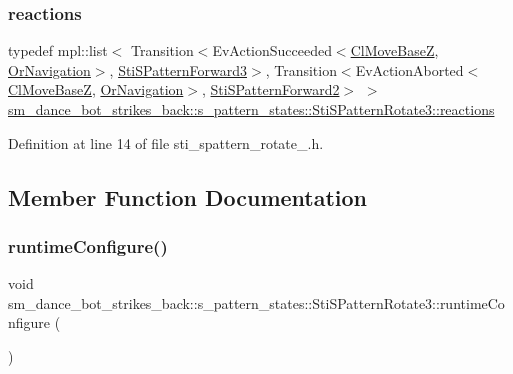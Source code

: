 \subsubsection{\texorpdfstring{reactions}{reactions}}
{\footnotesize\ttfamily typedef mpl\+::list$<$ Transition$<$Ev\+Action\+Succeeded$<$\hyperlink{classmove__base__z__client_1_1ClMoveBaseZ}{Cl\+Move\+BaseZ}, \hyperlink{classsm__dance__bot__strikes__back_1_1OrNavigation}{Or\+Navigation}$>$, \hyperlink{structsm__dance__bot__strikes__back_1_1s__pattern__states_1_1StiSPatternForward3}{Sti\+S\+Pattern\+Forward3}$>$, Transition$<$Ev\+Action\+Aborted$<$\hyperlink{classmove__base__z__client_1_1ClMoveBaseZ}{Cl\+Move\+BaseZ}, \hyperlink{classsm__dance__bot__strikes__back_1_1OrNavigation}{Or\+Navigation}$>$, \hyperlink{structsm__dance__bot__strikes__back_1_1s__pattern__states_1_1StiSPatternForward2}{Sti\+S\+Pattern\+Forward2}$>$ $>$ \hyperlink{structsm__dance__bot__strikes__back_1_1s__pattern__states_1_1StiSPatternRotate3_a01494011589ff9f082011cd9a33574e6}{sm\+\_\+dance\+\_\+bot\+\_\+strikes\+\_\+back\+::s\+\_\+pattern\+\_\+states\+::\+Sti\+S\+Pattern\+Rotate3\+::reactions}}



Definition at line 14 of file sti\+\_\+spattern\+\_\+rotate\+\_.\+h.



\subsection{Member Function Documentation}
\mbox{\label{structsm__dance__bot__strikes__back_1_1s__pattern__states_1_1StiSPatternRotate3_a208b42799fa33979d9151fcf2fa7b80c}} 
\subsubsection{\texorpdfstring{runtime\+Configure()}{runtimeConfigure()}}
{\footnotesize\ttfamily void sm\+\_\+dance\+\_\+bot\+\_\+strikes\+\_\+back\+::s\+\_\+pattern\+\_\+states\+::\+Sti\+S\+Pattern\+Rotate3\+::runtime\+Configure (\begin{DoxyParamCaption}{ }\end{DoxyParamCaption})\hspace{0.3cm}{\ttfamily [inline]}}



